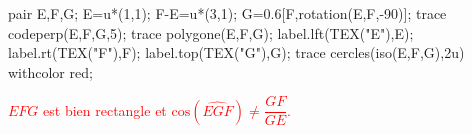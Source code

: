 \begin{corrige}
\begin{minipage}{0.45\linewidth}
        \bigskip
        \begin{Geometrie}
            pair E,F,G;
            E=u*(1,1);
            F-E=u*(3,1);            
            G=0.6[F,rotation(E,F,-90)];
            trace codeperp(E,F,G,5);
            trace polygone(E,F,G);
            label.lft(TEX("E"),E);
            label.rt(TEX("F"),F);
            label.top(TEX("G"),G);
            trace cercles(iso(E,F,G),2u) withcolor red;
        \end{Geometrie}
        \textcolor{red}{$EFG$ est bien rectangle et $\text{cos}(\widehat{EGF})\neq\dfrac{GF}{GE}$.}
    \end{minipage}
\end{corrige}

